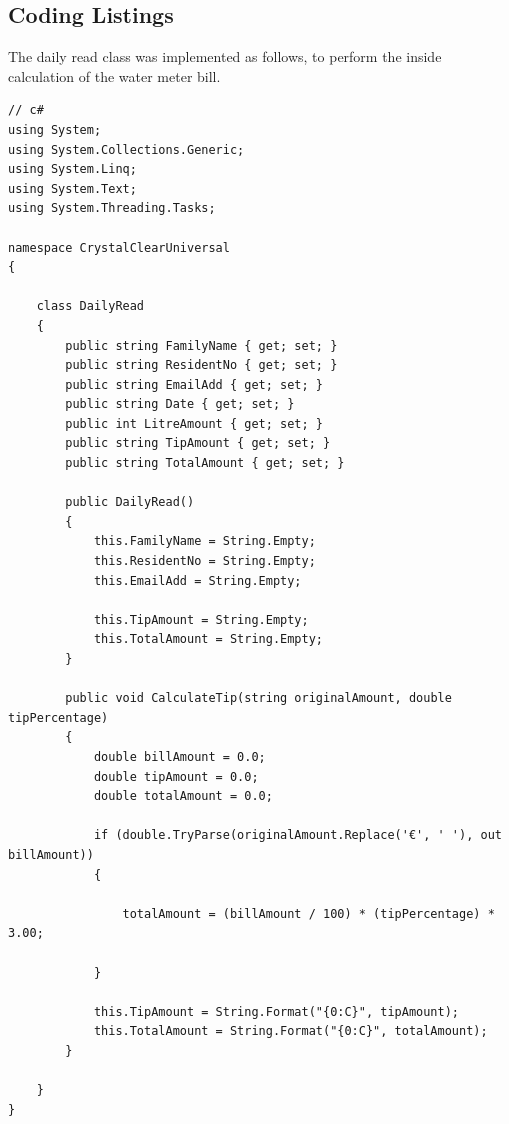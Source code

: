 \documentclass[runningheads,a4paper]{llncs}
\begin{document}
\subsection{Coding Listings}
The daily read class was implemented as follows, to perform the inside calculation of the water meter bill.
\begin{lstlisting}
// c#
using System;
using System.Collections.Generic;
using System.Linq;
using System.Text;
using System.Threading.Tasks;

namespace CrystalClearUniversal
{
    
    class DailyRead
    {
        public string FamilyName { get; set; }
        public string ResidentNo { get; set; }
        public string EmailAdd { get; set; }
        public string Date { get; set; }
        public int LitreAmount { get; set; }
        public string TipAmount { get; set; }
        public string TotalAmount { get; set; }
   
        public DailyRead()
        {
            this.FamilyName = String.Empty;
            this.ResidentNo = String.Empty;
            this.EmailAdd = String.Empty;

            this.TipAmount = String.Empty;
            this.TotalAmount = String.Empty;
        }

        public void CalculateTip(string originalAmount, double tipPercentage)
        {
            double billAmount = 0.0;
            double tipAmount = 0.0;
            double totalAmount = 0.0;

            if (double.TryParse(originalAmount.Replace('€', ' '), out billAmount))
            {

                totalAmount = (billAmount / 100) * (tipPercentage) * 3.00;

            }

            this.TipAmount = String.Format("{0:C}", tipAmount);
            this.TotalAmount = String.Format("{0:C}", totalAmount);
        }

    }
}

\end{lstlisting}
\end{document}
